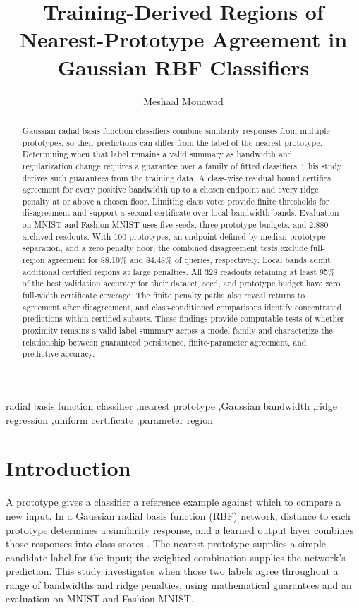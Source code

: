 \documentclass[preprint,12pt,authoryear]{elsarticle}
\begin{document}
\begin{frontmatter}
\title{Training-Derived Regions of Nearest-Prototype Agreement in Gaussian RBF Classifiers}
\author[msu]{Meshaal Mouawad}
\begin{abstract}
Gaussian radial basis function classifiers combine similarity responses from multiple prototypes, so their predictions can differ from the label of the nearest prototype. Determining when that label remains a valid summary as bandwidth and regularization change requires a guarantee over a family of fitted classifiers. This study derives such guarantees from the training data. A class-wise residual bound certifies agreement for every positive bandwidth up to a chosen endpoint and every ridge penalty at or above a chosen floor. Limiting class votes provide finite thresholds for disagreement and support a second certificate over local bandwidth bands. Evaluation on MNIST and Fashion-MNIST uses five seeds, three prototype budgets, and 2,880 archived readouts. With 100 prototypes, an endpoint defined by median prototype separation, and a zero penalty floor, the combined disagreement tests exclude full-region agreement for 88.10\% and 84.48\% of queries, respectively. Local bands admit additional certified regions at large penalties. All 328 readouts retaining at least 95\% of the best validation accuracy for their dataset, seed, and prototype budget have zero full-width certificate coverage. The finite penalty paths also reveal returns to agreement after disagreement, and class-conditioned comparisons identify concentrated predictions within certified subsets. These findings provide computable tests of whether proximity remains a valid label summary across a model family and characterize the relationship between guaranteed persistence, finite-parameter agreement, and predictive accuracy.
\end{abstract}
\begin{keyword}
radial basis function classifier \sep nearest prototype \sep Gaussian bandwidth \sep ridge regression \sep uniform certificate \sep parameter region
\end{keyword}
\end{frontmatter}
\section{Introduction}
A prototype gives a classifier a reference example against which to compare a new input. In a Gaussian radial basis function (RBF) network, distance to each prototype determines a similarity response, and a learned output layer combines those responses into class scores \citep{broomhead1988}. The nearest prototype supplies a simple candidate label for the input; the weighted combination supplies the network's prediction. This study investigates when those two labels agree throughout a range of bandwidths and ridge penalties, using mathematical guarantees and an evaluation on MNIST and Fashion-MNIST.
\end{document}
